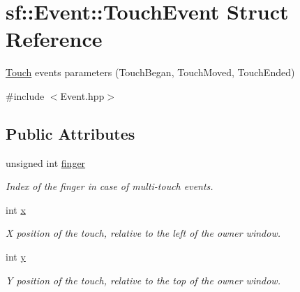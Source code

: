 \hypertarget{structsf_1_1_event_1_1_touch_event}{}\section{sf\+:\+:Event\+:\+:Touch\+Event Struct Reference}
\label{structsf_1_1_event_1_1_touch_event}


\mbox{\hyperlink{classsf_1_1_touch}{Touch}} events parameters (Touch\+Began, Touch\+Moved, Touch\+Ended)  




{\ttfamily \#include $<$Event.\+hpp$>$}

\subsection*{Public Attributes}
\begin{DoxyCompactItemize}
\item 
\mbox{\label{structsf_1_1_event_1_1_touch_event_a9a79fe86bf9ac3c16ec7326f96feb61a}} 
unsigned int \mbox{\hyperlink{structsf_1_1_event_1_1_touch_event_a9a79fe86bf9ac3c16ec7326f96feb61a}{finger}}
\begin{DoxyCompactList}\small\item\em Index of the finger in case of multi-\/touch events. \end{DoxyCompactList}\item 
\mbox{\label{structsf_1_1_event_1_1_touch_event_a8993963790b850caa68b98d3cad2be45}} 
int \mbox{\hyperlink{structsf_1_1_event_1_1_touch_event_a8993963790b850caa68b98d3cad2be45}{x}}
\begin{DoxyCompactList}\small\item\em X position of the touch, relative to the left of the owner window. \end{DoxyCompactList}\item 
\mbox{\label{structsf_1_1_event_1_1_touch_event_add80639dc68bc37e3275744d501cdbe0}} 
int \mbox{\hyperlink{structsf_1_1_event_1_1_touch_event_add80639dc68bc37e3275744d501cdbe0}{y}}
\begin{DoxyCompactList}\small\item\em Y position of the touch, relative to the top of the owner window. \end{DoxyCompactList}\end{DoxyCompactItemize}



